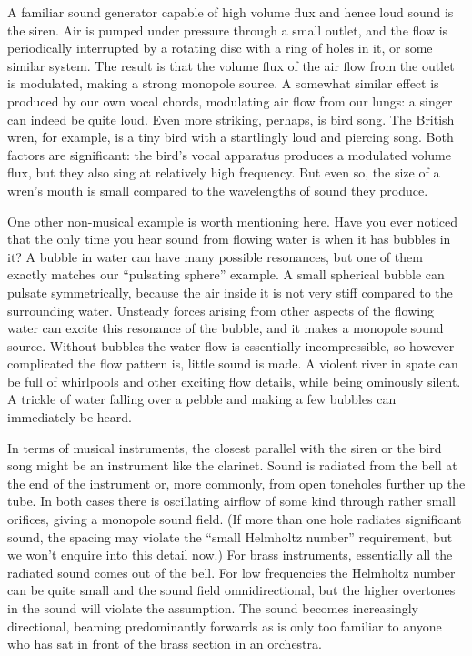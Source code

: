  A familiar sound generator capable of high volume flux and hence loud sound 
  is the siren. Air is pumped under pressure through a small outlet, and the 
  flow is periodically interrupted by a rotating disc with a ring of holes in 
  it, or some similar system. The result is that the volume flux of the air 
  flow from the outlet is modulated, making a strong monopole source. A 
  somewhat similar effect is produced by our own vocal chords, modulating air 
  flow from our lungs: a singer can indeed be quite loud. Even more striking, 
  perhaps, is bird song. The British wren, for example, is a tiny bird with a 
  startlingly loud and piercing song. Both factors are significant: the bird's 
  vocal apparatus produces a modulated volume flux, but they also sing at 
  relatively high frequency. But even so, the size of a wren's mouth is small 
  compared to the wavelengths of sound they produce. 

  One other non-musical example is worth mentioning here. Have you ever noticed 
  that the only time you hear sound from flowing water is when it has bubbles 
  in it? A bubble in water can have many possible resonances, but one of them 
  exactly matches our ``pulsating sphere'' example. A small spherical bubble 
  can pulsate symmetrically, because the air inside it is not very stiff 
  compared to the surrounding water. Unsteady forces arising from other aspects 
  of the flowing water can excite this resonance of the bubble, and it makes a 
  monopole sound source. Without bubbles the water flow is essentially 
  incompressible, so however complicated the flow pattern is, little sound is 
  made. A violent river in spate can be full of whirlpools and other exciting 
  flow details, while being ominously silent. A trickle of water falling over a 
  pebble and making a few bubbles can immediately be heard. 

  In terms of musical instruments, the closest parallel with the siren or the 
  bird song might be an instrument like the clarinet. Sound is radiated from 
  the bell at the end of the instrument or, more commonly, from open toneholes 
  further up the tube. In both cases there is oscillating airflow of some kind 
  through rather small orifices, giving a monopole sound field. (If more than 
  one hole radiates significant sound, the spacing may violate the ``small 
  Helmholtz number'' requirement, but we won't enquire into this detail now.) 
  For brass instruments, essentially all the radiated sound comes out of the 
  bell. For low frequencies the Helmholtz number can be quite small and the 
  sound field omnidirectional, but the higher overtones in the sound will 
  violate the assumption. The sound becomes increasingly directional, beaming 
  predominantly forwards as is only too familiar to anyone who has sat in front 
  of the brass section in an orchestra. 

